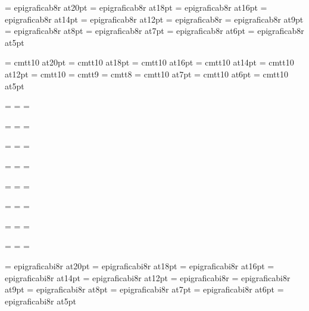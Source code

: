 \font\twentybf=     epigraficab8r at20pt
\font\eighteenbf=   epigraficab8r at18pt
\font\sixteenbf=    epigraficab8r at16pt
\font\fourteenbf=   epigraficab8r at14pt
\font\twelvebf=     epigraficab8r at12pt
\font\tenbf=        epigraficab8r
\font\ninebf=       epigraficab8r at9pt
\font\eightbf=      epigraficab8r at8pt
\font\sevenbf=      epigraficab8r at7pt
\font\sixbf=        epigraficab8r at6pt
\font\fivebf=       epigraficab8r at5pt

\font\twentytt=     cmtt10 at20pt
\font\eighteentt=   cmtt10 at18pt
\font\sixteentt=    cmtt10 at16pt
\font\fourteentt=   cmtt10 at14pt
\font\twelvett=     cmtt10 at12pt
\font\tentt=        cmtt10
\font\ninett=       cmtt9
\font\eighttt=      cmtt8
\font\seventt=      cmtt10 at7pt
\font\sixtt=        cmtt10 at6pt
\font\fivett=       cmtt10 at5pt




=\tenrm
{}=\sevenrm
{}=\fiverm
\def\rm{\fam=0 \tenrm}

=\teni
{}=\seveni
{}=\fivei
\def\mit{\fam=1}

=\tensy
{}=\sevensy
{}=\fivesy
\def\cal{\fam=2}

=\tenex
{}=\sevenex
{}=\fiveex


\def\it{\fam=\itfam \tenit}
\textfont\itfam=\tenit
\scriptfont\itfam=\sevenit
\scriptscriptfont\itfam=\fiveit

\def\sl{\fam=\slfam \tensl}
\textfont\slfam=\tensl
\scriptfont\slfam=\sevensl
\scriptscriptfont\slfam=\fivesl

\def\bf{\fam=\bffam \tenbf}
\textfont\bffam=\tenbf
\scriptfont\bffam=\sevenbf
\scriptscriptfont\bffam=\fivebf

\def\tt{\fam=\ttfam \tentt}
\textfont\ttfam=\tentt
\scriptfont\ttfam=\seventt
\scriptscriptfont\ttfam=\fivett

\font\twentyitbf=      epigraficabi8r at20pt
\font\eighteenitbf=    epigraficabi8r at18pt
\font\sixteenitbf=     epigraficabi8r at16pt
\font\fourteenitbf=    epigraficabi8r at14pt
\font\twelveitbf=      epigraficabi8r at12pt
\font\itbf=            epigraficabi8r
\font\nineitbf=        epigraficabi8r at9pt
\font\eightitbf=       epigraficabi8r at8pt
\font\sevenitbf=       epigraficabi8r at7pt
\font\sixitbf=         epigraficabi8r at6pt
\font\fiveitbf=        epigraficabi8r at5pt


